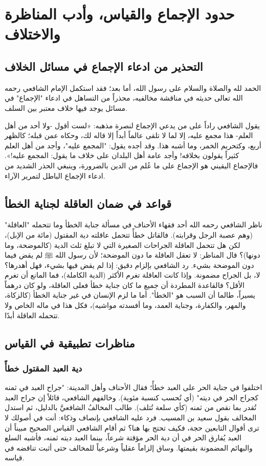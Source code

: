 \chapter{حدود الإجماع والقياس، وأدب المناظرة والاختلاف}

\section{التحذير من ادعاء الإجماع في مسائل الخلاف}
الحمد لله والصلاة والسلام على رسول الله، أما بعد؛ فقد استكمل الإمام الشافعي رحمه الله تعالى حديثه في مناقشة مخالفيه، محذراً من التساهل في ادعاء "الإجماع" في مسائل يوجد فيها خلاف معتبر بين السلف.

يقول الشافعي راداً على من يدعي الإجماع لنصرة مذهبه: «لست أقول -ولا أحد من أهل العلم- هذا مجمع عليه، إلا لما لا تلقى عالماً أبداً إلا قاله لك، وحكاه عمن قبله؛ كالظهر أربع، وكتحريم الخمر، وما أشبه هذا. وقد أجده يقول: "المجمع عليه"، وأجد من أهل العلم كثيراً يقولون بخلافه! وأجد عامة أهل البلدان على خلاف ما يقول: المجمع عليه!». 
فالإجماع اليقيني هو الإجماع على ما عُلم من الدين بالضرورة، وينبغي الحذر الشديد من ادعاء الإجماع الباطل لتمرير الآراء.

\section{قواعد في ضمان العاقلة لجناية الخطأ}
ناظر الشافعي رحمه الله أحد فقهاء الأحناف في مسألة جناية الخطأ وما تتحمله "العاقلة" (وهم عصبة الرجل وقرابته).
فالقاتل خطأً تتحمل عاقلته دية المقتول (مائة من الإبل)، لكن هل تتحمل العاقلة الجراحات الصغيرة التي لا تبلغ ثلث الدية (كالموضحة، وما دونها)؟
قال المناظر: لا تعقل العاقلة ما دون الموضحة؛ لأن رسول الله ﷺ لم يقض فيما دون الموضحة بشيء.
رد الشافعي بإلزام دقيق: إذا لم يقض فيها بشيء، فهل أهدرها؟ لا، بل الجراح مضمونة. وإذا كانت العاقلة تغرم الأكثر (الدية الكاملة)، فما المانع أن تغرم الأقل؟ فالقاعدة المطردة أن جميع ما كان جناية خطأ فعلى العاقلة، ولو كان درهماً يسيراً، طالما أن السبب هو "الخطأ". 
أما ما لزم الإنسان في غير جناية الخطأ (كالزكاة، والمهر، والكفارة، وجناية العمد، وما أفسدته مواشيه)، فكل هذا في ماله الخاص ولا تتحمله العاقلة أبدًا.

\section{مناظرات تطبيقية في القياس}

\subsection{دية العبد المقتول خطأً}
اختلفوا في جناية الحر على العبد خطأً؛ فقال الأحناف وأهل المدينة: "جراح العبد في ثمنه كجراح الحر في ديته" (أي تُحسب كنسبة مئوية). وخالفهم الشافعي، قائلاً إن جراح العبد تُقدر بما نقص من ثمنه (كأي سلعة تُتلف).
طالب المخالفُ الشافعيَّ بالدليل، ثم استدل المخالف بقول سعيد بن المسيب.
فرد عليه الشافعي بإنصاف وذكاء: أنت في أصولك لا ترى أقوال التابعين حجة، فكيف تحتج بها هنا؟ ثم أقام الشافعي القياس الصحيح مبيناً أن العبد يُفارق الحر في أن دية الحر مؤقتة شرعاً، بينما العبد ديته ثمنه، فأشبه السلع والبهائم المضمونة بقيمتها. وساق إلزاماً عقلياً وشرعياً للمخالف حتى أثبت تناقضه في قياسه.

